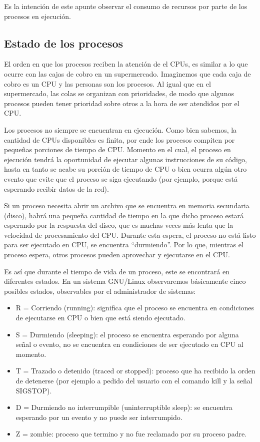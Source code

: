 \documentclass[12pt]{article}
\begin{document}
Es la intención de este apunte observar el consumo de recursos por parte de 
los procesos en ejecución. 
 
\subsection*{Estado de los procesos}

El orden en que los procesos reciben la atención de el CPUs, es 
similar a lo que ocurre con las cajas de cobro en un supermercado. 
Imaginemos que cada caja de cobro es un CPU y las personas son los 
procesos. Al igual que en el supermercado, las colas se organizan con 
prioridades, de modo que algunos procesos pueden tener prioridad 
sobre otros a la hora de ser atendidos por el CPU. 

Los procesos no siempre se encuentran en ejecución. 
Como bien sabemos, la cantidad de CPUs disponibles es finita, por ende 
los procesos compiten por 
pequeñas porciones de tiempo de CPU. Momento en el cual, el proceso en 
ejecución tendrá la oportunidad de ejecutar algunas instrucciones de su 
código, hasta en tanto se acabe su porción de tiempo de CPU o bien ocurra 
algún otro evento que evite que el proceso se siga ejecutando (por ejemplo, 
porque está esperando recibir datos de la red). 

Si un proceso necesita abrir un archivo que se encuentra en 
memoria secundaria (disco), habrá una pequeña cantidad de tiempo en la que 
dicho proceso estará esperando por la respuesta del disco, que es muchas 
veces más lenta que la velocidad de procesamiento del CPU. Durante esta
espera, el proceso no está listo para ser ejecutado en CPU, se encuentra 
``durmiendo''. Por lo que, mientras el proceso espera, otros procesos 
pueden aprovechar y ejecutarse en el CPU. 
  
Es así que durante el tiempo de vida de un proceso, este se encontrará en 
diferentes estados. En un sistema GNU/Linux observaremos básicamente 
cinco posibles estados, observables por el administrador de sistemas: 

\begin{itemize}
\item R = Corriendo (running): significa que el proceso se encuentra en 
condiciones de ejecutarse en CPU o bien que está siendo ejecutado.  
\item S = Durmiendo (sleeping): el proceso se encuentra esperando por 
alguna señal o evento, no se encuentra en condiciones de ser ejecutado en 
CPU al momento. 
\item T = Trazado o detenido (traced or stopped): proceso que ha recibido 
la orden de detenerse (por ejemplo a pedido del usuario con el comando 
kill y la señal SIGSTOP). 
\item D = Durmiendo no interrumpible (uninterruptible sleep): se encuentra
esperando por un evento y no puede ser interrumpido. 
\item Z = zombie: proceso que termino y no fue reclamado por su proceso 
padre. 
\end{itemize}
\end{document}
